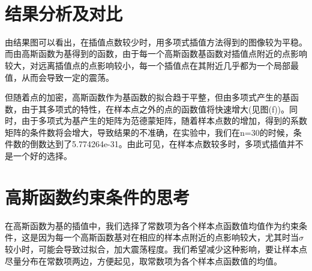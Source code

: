 \documentclass[12pt]{article}
\begin{document}
\begin{figure}[H]
{    }
    \quad\quad\quad\

\end{figure}

\section{结果分析及对比}
由结果图可以看出，在插值点数较少时，用多项式插值方法得到的图像较为平稳。而由高斯函数为基得到的函数，由于每一个高斯函数基函数对插值点附近的点影响较大，对远离插值点的点影响较小，每一个插值点在其附近几乎都为一个局部最值，从而会导致一定的震荡。

但随着点的加密，高斯函数作为基函数的拟合趋于平整，但由多项式产生的基函数，由于其多项式的特性，在样本点之外的点的函数值将快速增大(见图(f))。同时，由于多项式为基产生的矩阵为范德蒙矩阵，随着样本点数的增加，得到的系数矩阵的条件数将会增大，导致结果的不准确，在实验中，我们在n=30的时候，条件数的倒数达到了5.774264e-31。由此可见，在样本点数较多时，多项式插值并不是一个好的选择。

\section{高斯函数约束条件的思考}
在高斯函数为基的插值中，我们选择了常数项为各个样本点函数值均值作为约束条件，这是因为每一个高斯函数基对在相应的样本点附近的点影响较大，尤其时当$\sigma$较小时，可能会导致过拟合，加大震荡程度。我们希望减少这种影响，要让样本点尽量分布在常数项两边，方便起见，取常数项为各个样本点函数值的均值。
\end{document}

